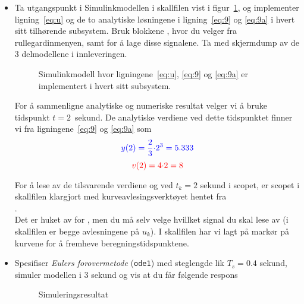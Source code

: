   
\begin{itemize}
\item Ta utgangspunkt i Simulinkmodellen i skallfilen
    vist i figur~\ref{fig:1a_dump},
    og implementer ligning~\eqref{eq:u} og de to analytiske løsningene i
    ligning~\eqref{eq:9} og 
    \eqref{eq:9a} i hvert sitt tilhørende subsystem. Bruk
    blokkene ,   hvor du velger  fra rullegardinmenyen,   samt  
    for å lage disse signalene.  {\color{black}Ta med skjermdump av
      de 3 delmodellene i innleveringen.} 
    \begin{figure}[H]
      \centering
      \hspace*{0mm}
      \caption{Simulinkmodell hvor ligningene~\eqref{eq:u}, \eqref{eq:9} og 
    \eqref{eq:9a} er implementert i hvert sitt subsystem. }
      \label{fig:1a_dump}
    \end{figure}

    For å sammenligne analytiske og numeriske resultat 
    velger vi å bruke tidspunkt $t{=}2$~sekund. De 
    analytiske verdiene ved dette tidspunktet finner vi fra ligningene~\eqref{eq:9}
    og \eqref{eq:9a} som
    \begin{equation}
      \label{eq:92}
      {\color{blue}{y(2) = \frac{2}{3} {\cdot}2^{3}=5.333}}       
    \end{equation}
    \begin{equation}
      {\color{red}{v(2)  = 4{\cdot}2 = 8}}  \label{eq:9a2}       
    \end{equation}

    For å lese av de  tilsvarende verdiene {\color{blue}} og
      {\color{red}} ved $t_{k}{=}2$ sekund i scopet, er
      scopet i skallfilen klargjort med  kurveavlesingsverktøyet
      hentet fra\\ .\\

      Det er  huket av for  ,
      men du må selv velge hvillket signal du skal lese av (i
      skallfilen er  begge avlesningene på $u_{k}$).
      I skallfilen har vi lagt  på markør på kurvene for å fremheve
      beregningstids\-punktene.

      \newpage
\item Spesifiser {\it Eulers forovermetode} ({\tt ode1}) med
  steglengde lik $T_{s}{=}0.4$ sekund, simuler modellen i 3 sekund og
  vis at du får følgende respons
  \begin{figure}[H]
    \centering
    \hspace*{10mm}
    \caption{Simuleringsresultat }
    \label{fig:oppg3_1}
  \end{figure}
  

\end{itemize}
